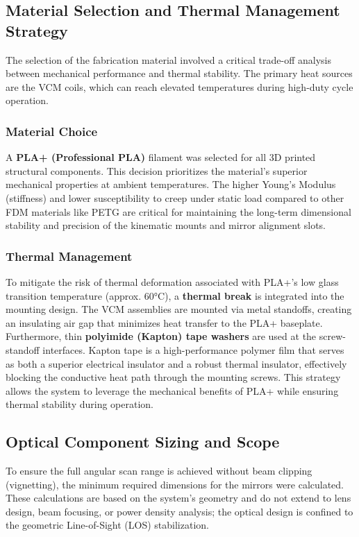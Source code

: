 \documentclass[12pt]{article}
\begin{document}
\subsection{Material Selection and Thermal Management Strategy}

The selection of the fabrication material involved a critical trade-off analysis between mechanical performance and thermal stability. The primary heat sources are the VCM coils, which can reach elevated temperatures during high-duty cycle operation.

\subsubsection{Material Choice}
A \textbf{PLA+ (Professional PLA)} filament was selected for all 3D printed structural components. This decision prioritizes the material's superior mechanical properties at ambient temperatures. The higher Young's Modulus (stiffness) and lower susceptibility to creep under static load compared to other FDM materials like PETG are critical for maintaining the long-term dimensional stability and precision of the kinematic mounts and mirror alignment slots.

\subsubsection{Thermal Management}
To mitigate the risk of thermal deformation associated with PLA+'s low glass transition temperature (approx. 60°C), a \textbf{thermal break} is integrated into the mounting design. The VCM assemblies are mounted via metal standoffs, creating an insulating air gap that minimizes heat transfer to the PLA+ baseplate. Furthermore, thin \textbf{polyimide (Kapton) tape washers} are used at the screw-standoff interfaces. Kapton tape is a high-performance polymer film that serves as both a superior electrical insulator and a robust thermal insulator, effectively blocking the conductive heat path through the mounting screws. This strategy allows the system to leverage the mechanical benefits of PLA+ while ensuring thermal stability during operation.


\subsection{Optical Component Sizing and Scope}

To ensure the full angular scan range is achieved without beam clipping (vignetting), the minimum required dimensions for the mirrors were calculated. These calculations are based on the system's geometry and do not extend to lens design, beam focusing, or power density analysis; the optical design is confined to the geometric Line-of-Sight (LOS) stabilization.
\end{document}
